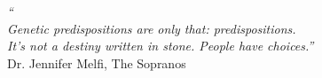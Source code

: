 \cleardoublepage
\thispagestyle{plain}

\vspace*{8cm}

\begin{flushright}
   \textsl{``\\Genetic predispositions are only that: predispositions. \\
      It’s not a destiny written in stone. People have choices.''} \\
\vspace*{1.5cm}
            Dr. Jennifer Melfi, The Sopranos
\end{flushright}
